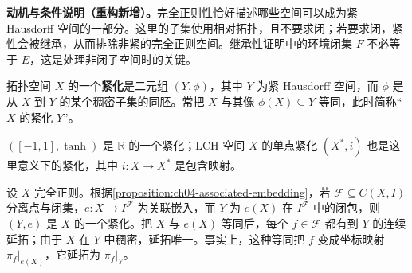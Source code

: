 \documentclass[../../main.tex]{subfiles}
\begin{document}
\begin{remark}
\textbf{动机与条件说明（重构新增）。}完全正则性恰好描述哪些空间可以成为紧 Hausdorff 空间的一部分。这里的子集使用相对拓扑，且不要求闭；若要求闭，紧性会被继承，从而排除非紧的完全正则空间。继承性证明中的环境闭集 $F$ 不必等于 $E$，这是处理非闭子空间时的关键。
\end{remark}
\begin{definition}[紧化]\label{definition:ch04-compactification}
拓扑空间 $X$ 的一个\textbf{紧化}是二元组 $(Y,\phi)$，其中 $Y$ 为紧 Hausdorff 空间，而 $\phi$ 是从 $X$ 到 $Y$ 的某个稠密子集的同胚。常把 $X$ 与其像 $\phi(X)\subseteq Y$ 等同，此时简称“$X$ 的紧化 $Y$”。
\end{definition}
\begin{example}\label{example:ch04-compactification-examples}
$([-1,1],\tanh)$ 是 $\mathbb R$ 的一个紧化；LCH 空间 $X$ 的单点紧化 $(X^*,i)$ 也是这里意义下的紧化，其中 $i:X\to X^*$ 是包含映射。
\end{example}
设 $X$ 完全正则。根据\cref{proposition:ch04-associated-embedding}，若 $\mathcal F\subseteq C(X,I)$ 分离点与闭集，$e:X\to I^{\mathcal F}$ 为关联嵌入，而 $Y$ 为 $e(X)$ 在 $I^{\mathcal F}$ 中的闭包，则 $(Y,e)$ 是 $X$ 的一个紧化。把 $X$ 与 $e(X)$ 等同后，每个 $f\in\mathcal F$ 都有到 $Y$ 的连续延拓；由于 $X$ 在 $Y$ 中稠密，延拓唯一。事实上，这种等同把 $f$ 变成坐标映射 $\pi_f|_{e(X)}$，它延拓为 $\pi_f|_Y$。
\end{document}
